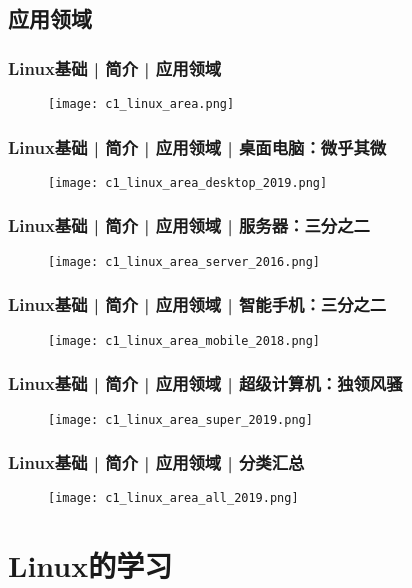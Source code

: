 \subsection{应用领域}
\begin{frame}
  \frametitle{Linux基础 | 简介 | 应用领域}
  \begin{figure}
    \centering
    \texttt{[image: c1\_linux\_area.png]}
  \end{figure}
\end{frame}

\begin{frame}
  \frametitle{Linux基础 | 简介 | 应用领域 | 桌面电脑：微乎其微}
  \begin{figure}
    \centering
    \texttt{[image: c1\_linux\_area\_desktop\_2019.png]}
  \end{figure}
\end{frame}

\begin{frame}
  \frametitle{Linux基础 | 简介 | 应用领域 | 服务器：三分之二}
  \begin{figure}
    \centering
    \texttt{[image: c1\_linux\_area\_server\_2016.png]}
  \end{figure}
\end{frame}

\begin{frame}
  \frametitle{Linux基础 | 简介 | 应用领域 | 智能手机：三分之二}
  \begin{figure}
    \centering
    \texttt{[image: c1\_linux\_area\_mobile\_2018.png]}
  \end{figure}
\end{frame}

\begin{frame}
  \frametitle{Linux基础 | 简介 | 应用领域 | 超级计算机：独领风骚}
  \begin{figure}
    \centering
    \texttt{[image: c1\_linux\_area\_super\_2019.png]}
  \end{figure}
\end{frame}

\begin{frame}
  \frametitle{Linux基础 | 简介 | 应用领域 | 分类汇总}
  \begin{figure}
    \centering
    \texttt{[image: c1\_linux\_area\_all\_2019.png]}
  \end{figure}
\end{frame}

\section{Linux的学习}
